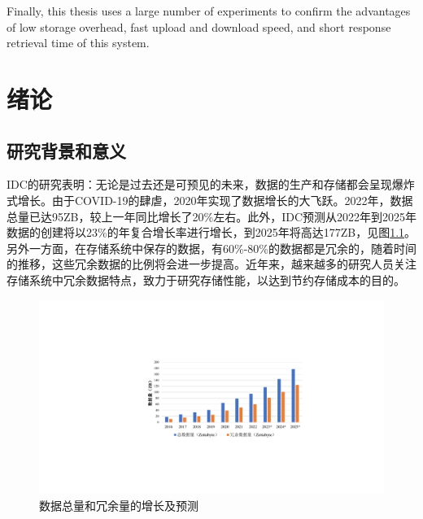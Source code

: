 \documentclass[promaster]{thesis-uestc}
\begin{document}
\begin{englishabstract}
    Finally, this thesis uses a large number of experiments to confirm the advantages of low storage overhead, fast upload and download speed, and short response retrieval time of this system.


\end{englishabstract}

\thesistableofcontents %
\thesisglossarylist %

\chapter{绪\hspace{6pt}论}


\section{研究背景和意义}\label{研究背景和意义}
\acrlong{IDC}的研究表明：无论是过去还是可预见的未来，数据的生产和存储都会呈现爆炸式增长。由于COVID-19的肆虐，2020年实现了数据增长的大飞跃。2022年，数据总量已达95\acrshort{ZB}，较上一年同比增长了20\%左右。此外，\acrlong{IDC}预测从2022年到2025年数据的创建将以23\%的年复合增长率进行增长，到2025年将高达177\acrshort{ZB}，见图\ref{数据总量和冗余量的增长及预测}。另外一方面，在存储系统中保存的数据，有60\%-80\%的数据都是冗余的，随着时间的推移，这些冗余数据的比例将会进一步提高。近年来，越来越多的研究人员关注存储系统中冗余数据特点，致力于研究存储性能，以达到节约存储成本的目的。

\begin{figure}[htbp]
    \centering
    \includegraphics[width = 0.9\linewidth]{pic/数据增长图}
    \caption{数据总量和冗余量的增长及预测}
    \label{数据总量和冗余量的增长及预测}
\end{figure}
\end{document}

